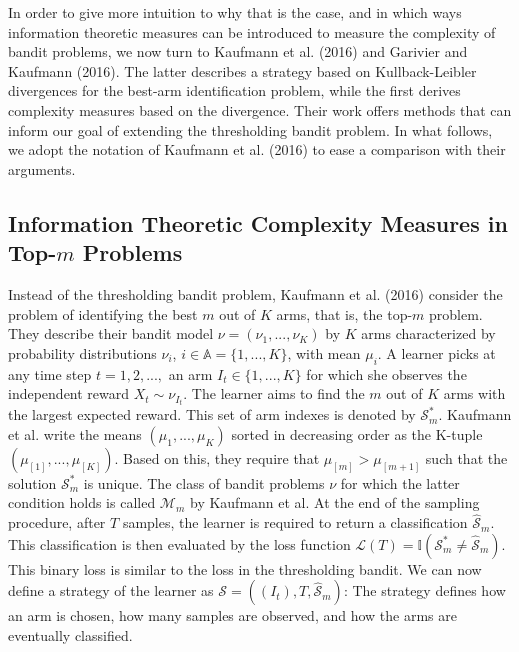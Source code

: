 \documentclass[11pt,]{article}
\begin{document}
In order to give more intuition to why that is the case, and in which
ways information theoretic measures can be introduced to measure the
complexity of bandit problems, we now turn to Kaufmann et al. (2016) and
Garivier and Kaufmann (2016). The latter describes a strategy based on
Kullback-Leibler divergences for the best-arm identification problem,
while the first derives complexity measures based on the divergence.
Their work offers methods that can inform our goal of extending the
thresholding bandit problem. In what follows, we adopt the notation of
Kaufmann et al. (2016) to ease a comparison with their arguments.

\subsection{\texorpdfstring{Information Theoretic Complexity Measures in
Top-\(m\) Problems
\label{sec:KaufmannEtAl2016}}{Information Theoretic Complexity Measures in Top-m Problems }}\label{information-theoretic-complexity-measures-in-top-m-problems}

Instead of the thresholding bandit problem, Kaufmann et al. (2016)
consider the problem of identifying the best \(m\) out of \(K\) arms,
that is, the top-\(m\) problem. They describe their bandit model
\(\nu = (\nu_1,...,\nu_K)\) by \(K\) arms characterized by probability
distributions \(\nu_i\), \(i \in \mathbb{A} = \{1,...,K\}\), with mean
\(\mu_i\). A learner picks at any time step \(t=1,2,...,\) an arm
\(I_t \in \{1,...,K\}\) for which she observes the independent reward
\(X_{t} \sim \nu_{I_t}\). The learner aims to find the \(m\) out of
\(K\) arms with the largest expected reward. This set of arm indexes is
denoted by \(\mathcal{S}_m^*\). Kaufmann et al. write the means
\((\mu_{1}, ..., \mu_{K})\) sorted in decreasing order as the K-tuple
\((\mu_{[1]}, ..., \mu_{[K]})\). Based on this, they require that
\(\mu_{[m]} > \mu_{[m+1]}\) such that the solution \(\mathcal{S}_m^*\)
is unique. The class of bandit problems \(\nu\) for which the latter
condition holds is called \(\mathcal{M}_m\) by Kaufmann et al. At the
end of the sampling procedure, after \(T\) samples, the learner is
required to return a classification \(\hat{\mathcal{S}}_m\). This
classification is then evaluated by the loss function
\(\mathcal{L}(T) = \mathbb{I}(\mathcal{S}^*_m \neq \hat{\mathcal{S}}_m)\).
This binary loss is similar to the loss in the thresholding bandit. We
can now define a strategy of the learner as
\(\mathcal{S} = ((I_t), T, \hat{\mathcal{S}}_m)\): The strategy defines
how an arm is chosen, how many samples are observed, and how the arms
are eventually classified.
\end{document}
